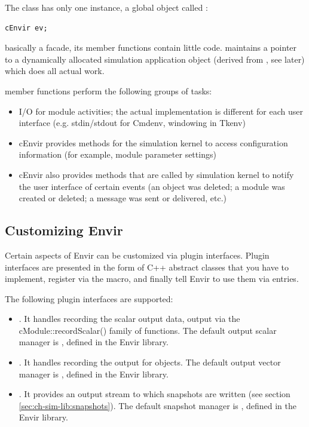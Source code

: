 The  class has only one instance, a global object
called :

\begin{verbatim}
cEnvir ev;
\end{verbatim}

 basically a facade, its member functions
contain little code.  maintains a pointer to a
dynamically allocated simulation application object (derived from
, see later) which does all actual work.


 member functions perform the following groups of tasks:
\begin{itemize}
  \item I/O for module activities; the actual implementation is different
    for each user interface (e.g. stdin/stdout for Cmdenv, windowing
    in Tkenv)
  \item cEnvir provides methods for the simulation kernel to
    access configuration information (for example, module parameter settings)
  \item cEnvir also provides methods that are called by simulation kernel to
    notify the user interface of certain events (an object was deleted;
    a module was created or deleted; a message was sent or delivered, etc.)
\end{itemize}


\subsection{Customizing Envir}
\label{sec:ch-opp-design:customization}

Certain aspects of Envir can be customized via plugin interfaces.
Plugin interfaces are presented in the form of C++ abstract classes
that you have to implement, register via the 
macro, and finally tell Envir to use them via  entries.

The following plugin interfaces are supported:

\begin{itemize}
   \item{. It handles recording the scalar output data,
     output via the cModule::recordScalar() family of functions.
     The default output scalar manager is ,
     defined in the Envir library.}
   \item{. It handles recording the output
     for  objects.
     The default output vector manager is ,
     defined in the Envir library.}
   \item{. It provides an output stream to which
     snapshots are written (see section \ref{sec:ch-sim-lib:snapshots}).
     The default snapshot manager is ,
     defined in the Envir library.}
\end{itemize}

